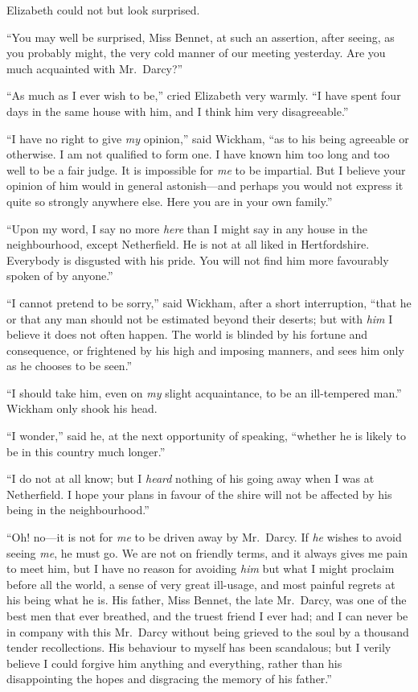 Elizabeth could not but look surprised.

``You may well be surprised, Miss Bennet, at such an assertion,
after seeing, as you probably might, the very cold manner of our
meeting yesterday.  Are you much acquainted with Mr.\ Darcy?''

``As much as I ever wish to be,'' cried Elizabeth very warmly.
``I have spent four days in the same house with him, and I think
him very disagreeable.''

``I have no right to give \emph{my} opinion,'' said Wickham, ``as to his
being agreeable or otherwise.  I am not qualified to form one.  I
have known him too long and too well to be a fair judge.  It is
impossible for \emph{me} to be impartial.  But I believe your opinion
of him would in general astonish---and perhaps you would not
express it quite so strongly anywhere else.  Here you are in your
own family.''

``Upon my word, I say no more \emph{here} than I might say in any
house in the neighbourhood, except Netherfield.  He is not at all
liked in Hertfordshire.  Everybody is disgusted with his pride.
You will not find him more favourably spoken of by anyone.''

``I cannot pretend to be sorry,'' said Wickham, after a short
interruption, ``that he or that any man should not be estimated
beyond their deserts; but with \emph{him} I believe it does not often
happen.  The world is blinded by his fortune and consequence,
or frightened by his high and imposing manners, and sees him
only as he chooses to be seen.''

``I should take him, even on \emph{my} slight acquaintance, to be an
ill-tempered man.''  Wickham only shook his head.

``I wonder,'' said he, at the next opportunity of speaking,
``whether he is likely to be in this country much longer.''

``I do not at all know; but I \emph{heard} nothing of his going away
when I was at Netherfield.  I hope your plans in favour of the
\gdash{}shire will not be affected by his being in the neighbourhood.''

``Oh! no---it is not for \emph{me} to be driven away by Mr.\ Darcy.  If
\emph{he} wishes to avoid seeing \emph{me}, he must go.  We are not on
friendly terms, and it always gives me pain to meet him, but I
have no reason for avoiding \emph{him} but what I might proclaim
before all the world, a sense of very great ill-usage, and most
painful regrets at his being what he is.  His father, Miss Bennet,
the late Mr.\ Darcy, was one of the best men that ever breathed,
and the truest friend I ever had; and I can never be in company
with this Mr.\ Darcy without being grieved to the soul by a
thousand tender recollections.  His behaviour to myself has been
scandalous; but I verily believe I could forgive him anything and
everything, rather than his disappointing the hopes and
disgracing the memory of his father.''

